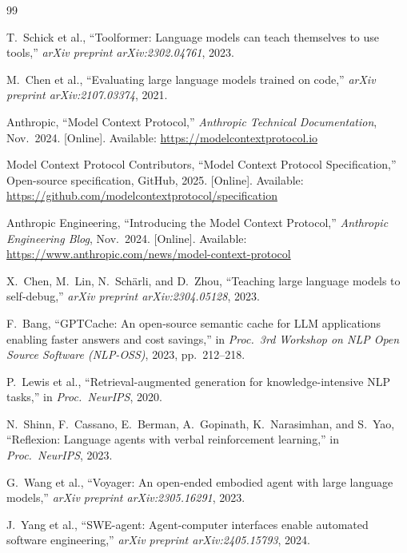 \documentclass[conference]{IEEEtran}
\begin{document}
\begin{thebibliography}{99}

T.~Schick et al., ``Toolformer: Language models can teach themselves to
use tools,'' \textit{arXiv preprint arXiv:2302.04761}, 2023.

M.~Chen et al., ``Evaluating large language models trained on code,''
\textit{arXiv preprint arXiv:2107.03374}, 2021.

Anthropic, ``Model Context Protocol,''
\textit{Anthropic Technical Documentation}, Nov.\ 2024.
[Online]. Available: \url{https://modelcontextprotocol.io}

Model Context Protocol Contributors, ``Model Context Protocol
Specification,'' Open-source specification, GitHub, 2025.
[Online]. Available: \url{https://github.com/modelcontextprotocol/specification}

Anthropic Engineering, ``Introducing the Model Context Protocol,''
\textit{Anthropic Engineering Blog}, Nov.\ 2024.
[Online]. Available: \url{https://www.anthropic.com/news/model-context-protocol}

X.~Chen, M.~Lin, N.~Sch\"{a}rli, and D.~Zhou, ``Teaching large language
models to self-debug,'' \textit{arXiv preprint arXiv:2304.05128}, 2023.

F.~Bang, ``GPTCache: An open-source semantic cache for LLM applications
enabling faster answers and cost savings,'' in \textit{Proc.\ 3rd Workshop
on NLP Open Source Software (NLP-OSS)}, 2023, pp.~212--218.

P.~Lewis et al., ``Retrieval-augmented generation for knowledge-intensive
NLP tasks,'' in \textit{Proc.\ NeurIPS}, 2020.

N.~Shinn, F.~Cassano, E.~Berman, A.~Gopinath, K.~Narasimhan, and
S.~Yao, ``Reflexion: Language agents with verbal reinforcement learning,''
in \textit{Proc.\ NeurIPS}, 2023.

G.~Wang et al., ``Voyager: An open-ended embodied agent with large
language models,'' \textit{arXiv preprint arXiv:2305.16291}, 2023.

J.~Yang et al., ``SWE-agent: Agent-computer interfaces enable automated
software engineering,'' \textit{arXiv preprint arXiv:2405.15793}, 2024.


\end{thebibliography}
\end{document}
